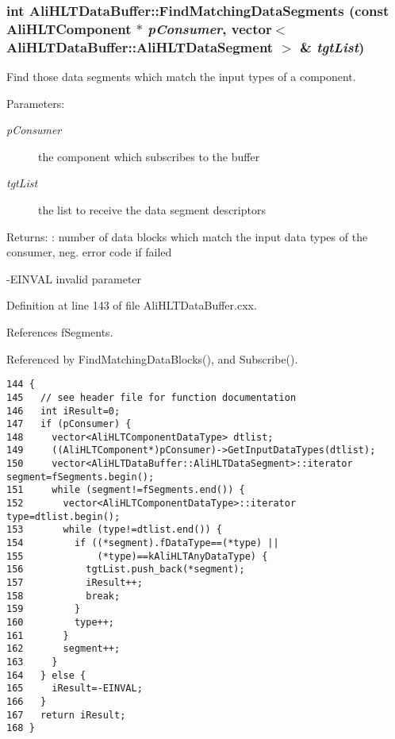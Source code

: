 \subsubsection{\setlength{\rightskip}{0pt plus 5cm}int Ali\-HLTData\-Buffer::Find\-Matching\-Data\-Segments (const {\bf Ali\-HLTComponent} $\ast$ {\em p\-Consumer}, vector$<$ {\bf Ali\-HLTData\-Buffer::Ali\-HLTData\-Segment} $>$ \& {\em tgt\-List})\hspace{0.3cm}{\tt  [private]}}\label{classAliHLTDataBuffer_d0}


Find those data segments which match the input types of a component. \begin{Desc}
\item[Parameters:]
\begin{description}
\item[{\em p\-Consumer}]the component which subscribes to the buffer \item[{\em tgt\-List}]the list to receive the data segment descriptors \end{description}
\end{Desc}
\begin{Desc}
\item[Returns:]: number of data blocks which match the input data types of the consumer, neg. error code if failed \par
 -EINVAL invalid parameter \par
 \end{Desc}


Definition at line 143 of file Ali\-HLTData\-Buffer.cxx.

References f\-Segments.

Referenced by Find\-Matching\-Data\-Blocks(), and Subscribe().

\footnotesize\begin{verbatim}144 {
145   // see header file for function documentation
146   int iResult=0;
147   if (pConsumer) {
148     vector<AliHLTComponentDataType> dtlist;
149     ((AliHLTComponent*)pConsumer)->GetInputDataTypes(dtlist);
150     vector<AliHLTDataBuffer::AliHLTDataSegment>::iterator segment=fSegments.begin();
151     while (segment!=fSegments.end()) {
152       vector<AliHLTComponentDataType>::iterator type=dtlist.begin();
153       while (type!=dtlist.end()) {
154         if ((*segment).fDataType==(*type) ||
155             (*type)==kAliHLTAnyDataType) {
156           tgtList.push_back(*segment);
157           iResult++;
158           break;
159         }
160         type++;
161       }
162       segment++;
163     }
164   } else {
165     iResult=-EINVAL;
166   }
167   return iResult;
168 }
\end{verbatim}\normalsize 


